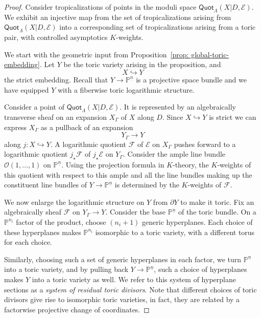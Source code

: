 \documentclass[10pt,a4paper]{amsart}
\begin{document}
\begin{proof}
Consider tropicalizations of points in the moduli space $\mathsf{Quot}_\Lambda(X|D,\mathcal E)$. We exhibit an injective map from the set of tropicalizations arising from $\mathsf{Quot}_\Lambda(X|D,\mathcal E)$ into a corresponding set of tropicalizations arising from a toric pair, with controlled asymptotics $K$-weights. 

We start with the geometric input from Proposition~\ref{prop: global-toric-embedding}. Let $Y$ be the toric variety arising in the proposition, and 
\[
X\hookrightarrow Y
\]
the strict embedding. Recall that $Y\to \mathbb P^{\underline n}$ is a projective space bundle and we have equipped $Y$ with a fiberwise toric logarithmic structure. 

Consider a point of $\mathsf{Quot}_\Lambda(X|D,\mathcal E)$. It is represented by an algebraically transverse sheaf on an expansion $X_\Gamma$ of $X$ along $D$. Since $X\hookrightarrow Y$ is strict we can express $X_\Gamma$ as a pullback of an expansion
\[
Y_\Gamma\to Y
\]
along $j\colon X\hookrightarrow Y$. A logarithmic quotient $\mathcal F$ of $\mathcal E$ on $X_\Gamma$ pushes forward to a logarithmic quotient $j_\star\mathcal F$ of $j_\star\mathcal E$ on $Y_\Gamma$. Consider the ample line bundle $\mathcal O(1,\ldots,1)$ on $\mathbb P^{\underline n}$. Using the projection formula in $K$-theory, the $K$-weights of this quotient with respect to this ample and all the line bundles making up the constituent line bundles of $Y\to \mathbb P^{\underline n}$ is determined by the $K$-weights of $\mathcal F$.  

We now enlarge the logarithmic structure on $Y$ from $\partial Y$ to make it toric. Fix an algebraically sheaf $\mathcal F$ on $Y_\Gamma\to Y$. Consider the base $\mathbb P^{\underline n}$ of the toric bundle. On a $\mathbb P^{n_i}$ factor of the product, choose $(n_i+1)$ generic hyperplanes. Each choice of these hyperplanes makes $\mathbb P^{n_i}$ isomorphic to a toric variety, with a different torus for each choice. 

Similarly, choosing such a set of generic hyperplanes in each factor, we turn $\mathbb P^{\underline n}$ into a toric variety, and by pulling back $Y\to \mathbb P^{\underline n}$, such a choice of hyperplanes makes $Y$ into a toric variety as well. We refer to this system of hyperplane sections as a {\it system of residual toric divisors}. Note that different choices of toric divisors give rise to isomorphic toric varieties, in fact, they are related by a factorwise projective change of coordinates. 


\end{proof}
\end{document}
